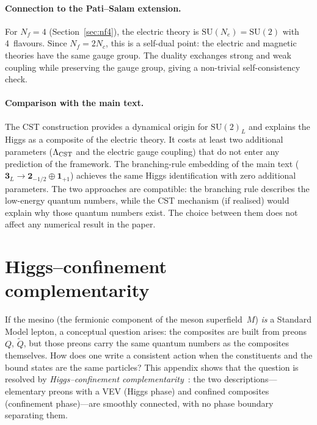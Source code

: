 \documentclass[12pt,a4paper]{article}
\newcommand{\SU}{\mathrm{SU}}
\newcommand{\Nf}{N_f}
\newcommand{\Nc}{N_c}
\begin{document}
\paragraph{Connection to the Pati--Salam extension.}
For $\Nf = 4$ (Section~\ref{sec:nf4}), the electric theory is
$\SU(N_e) = \SU(2)$ with 4~flavours.  Since $\Nf = 2\Nc$, this is
a self-dual point: the electric and magnetic theories have the same
gauge group.  The duality exchanges strong and weak coupling while
preserving the gauge group, giving a non-trivial self-consistency
check.

\paragraph{Comparison with the main text.}
The CST construction provides a dynamical origin for $\SU(2)_L$ and
explains the Higgs as a composite of the electric theory.  It costs
at least two additional parameters ($\Lambda_{\rm CST}$ and the
electric gauge coupling) that do not enter any prediction of the
framework.  The branching-rule embedding of the main text
($\mathbf{3}_L \to \mathbf{2}_{-1/2} \oplus \mathbf{1}_{+1}$)
achieves the same Higgs identification with zero additional
parameters.  The two approaches are compatible: the branching rule
describes the low-energy quantum numbers, while the CST mechanism
(if realised) would explain why those quantum numbers exist.
The choice between them does not affect any numerical
result in the paper.


\section{Higgs--confinement complementarity}
\label{app:complementarity}

If the mesino (the fermionic component of the meson superfield~$M$)
\emph{is} a Standard Model lepton, a conceptual question arises:
the composites are built from preons~$Q$, $\tilde{Q}$, but those
preons carry the same quantum numbers as the composites themselves.
How does one write a consistent action when the constituents and the
bound states are the same particles?  This appendix shows that the
question is resolved by
\emph{Higgs--confinement complementarity}~\cite{FradkinShenker:1979,
OsterwalderSeiler:1978}: the two descriptions---elementary preons
with a VEV (Higgs phase) and confined composites (confinement
phase)---are smoothly connected, with no phase boundary separating
them.
\end{document}
